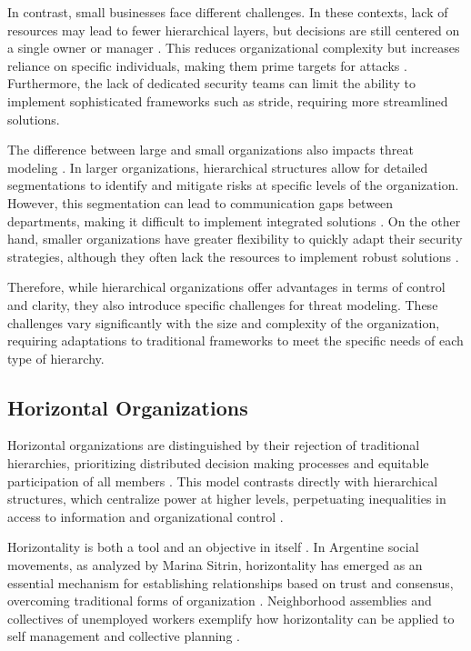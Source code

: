 In contrast, small businesses face different challenges. In these contexts, lack
of resources may lead to fewer hierarchical layers, but decisions are still
centered on a single owner or manager \cite{WorkerCooperativesandRevolution}.
This reduces organizational complexity but increases reliance on specific
individuals, making them prime targets for attacks
\cite{WorkerCooperativesinAmerica}. Furthermore, the lack of dedicated security
teams can limit the ability to implement sophisticated frameworks such as
\gls{stride}, requiring more streamlined solutions.

The difference between large and small organizations also impacts threat
modeling \cite{WorkerCooperativesinAmerica,
ThreatModelingASummaryOfAvailableMethods}. In larger organizations, hierarchical
structures allow for detailed segmentations to identify and mitigate risks at
specific levels of the organization. However, this segmentation can lead to
communication gaps between departments, making it difficult to implement
integrated solutions \cite{ThreatModelingASystematicLiteratureReview}. On the
other hand, smaller organizations have greater flexibility to quickly adapt
their security strategies, although they often lack the resources to implement
robust solutions \cite{WorkerCooperativesandRevolution}.

Therefore, while hierarchical organizations offer advantages in terms of control
and clarity, they also introduce specific challenges for threat modeling. These
challenges vary significantly with the size and complexity of the organization,
requiring adaptations to traditional frameworks to meet the specific needs of
each type of hierarchy.

\subsection{Horizontal Organizations}
\label{subsec:horizontal_organizations}

Horizontal organizations are distinguished by their rejection of traditional
hierarchies, prioritizing distributed decision making processes and equitable
participation of all members  \cite{Non-HierarchicalForms}.
This model contrasts directly with hierarchical
structures, which centralize power at higher levels, perpetuating inequalities
in access to information and organizational control \cite{Non-HierarchicalForms}.

Horizontality is both a tool and an objective in itself \cite{Colbac}. In
Argentine social movements, as analyzed by Marina Sitrin, horizontality has
emerged as an essential mechanism for establishing relationships based on trust
and consensus, overcoming traditional forms of organization \cite{EverydayRevolutions}.
Neighborhood assemblies and collectives of unemployed workers exemplify how horizontality can
be applied to self management and collective planning
\cite{EverydayRevolutions}.

